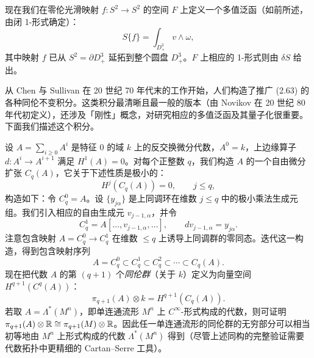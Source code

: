 现在我们在零伦光滑映射 $f:S^2\to S^2$ 的空间 $F$ 上定义一个多值泛函（如前所述，由闭 1-形式确定）：
\begin{equation}
  S\{f\}=\int_{D^3_+}v\wedge\omega, \tag{2.64}
\end{equation}
其中映射 $f$ 已从 $S^2=\partial D^3_+$ 延拓到整个圆盘 $D^3_+$。$F$ 上相应的 1-形式则由 $\delta S$ 给出。

从 Chen 与 Sullivan 在 20 世纪 70 年代末的工作开始，人们构造了推广 (2.63) 的各种同伦不变积分。这类积分最清晰且最一般的版本（由 Novikov 在 20 世纪 80 年代初定义），还涉及「刚性」概念，对研究相应的多值泛函及其量子化很重要。下面我们描述这个积分。

设 $A=\sum_{i\ge0}A^i$ 是特征 0 的域 $k$ 上的反交换微分代数，$A^0=k$，上边缘算子 $d:A^i\to A^{i+1}$ 满足 $H^1(A)=0$。对每个正整数 $q$，我们构造 $A$ 的一个自由微分扩张 $C_q(A)$，它关于下述性质是极小的：
\begin{equation}
  H^j(C_q(A))=0,\qquad j\le q, \tag{2.65}
\end{equation}
构造如下：令 $C^0_q=A$。设 $\{y_{j\alpha}\}$ 是上同调环在维数 $j\le q$ 中的极小乘法生成元组。我们引入相应的自由生成元 $v_{j-1,\alpha}$，并令
\[
  C^1_q=A[\dots,v_{j-1,\alpha},\dots],\qquad dv_{j-1,\alpha}=y_{j\alpha}.
\]
注意包含映射 $A=C^0_q\to C^1_q$ 在维数 $\le q$ 上诱导上同调群的零同态。迭代这一构造，得到包含映射序列
\[
  A=C^0_q\subset C^1_q\subset C^2_q\subset\cdots\subset C_q(A).
\]
现在把代数 $A$ 的第 $(q+1)$ 个\emph{同伦群}（关于 $k$）定义为向量空间 $H^{q+1}(C^q(A))$：
\begin{equation}
  \pi_{q+1}(A)\otimes k=H^{q+1}(C_q(A)). \tag{2.66}
\end{equation}
若取 $A=\Lambda^*(M^n)$，即单连通流形 $M^n$ 上 $C^\infty$-形式构成的代数，则可证明 $\pi_{q+1}(A)\otimes\mathbb{R}\cong\pi_{q+1}(M)\otimes\mathbb{R}$。因此任一单连通流形的同伦群的无穷部分可以相当初等地由 $M^n$ 上形式构成的代数 $\Lambda^*(M^n)$ 得到（尽管上述同构的完整验证需要代数拓扑中更精细的 Cartan--Serre 工具）。

